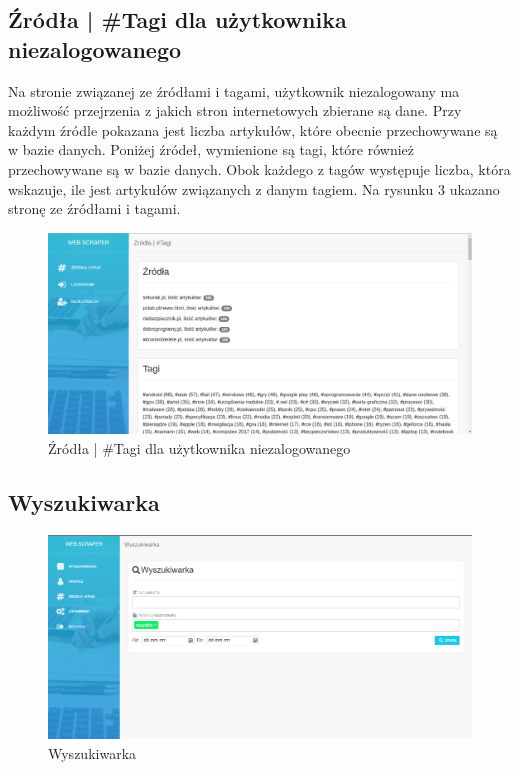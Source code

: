 \documentclass[12pt, titlepage]{article}
\begin{document}
	\subsection{Źródła | \#Tagi dla użytkownika niezalogowanego}
	Na stronie związanej ze źródłami i tagami, użytkownik niezalogowany ma możliwość przejrzenia z jakich stron internetowych zbierane są dane. Przy każdym źródle pokazana jest liczba artykułów, które obecnie przechowywane są w bazie danych. Poniżej źródeł, wymienione są tagi, które również przechowywane są w bazie danych. Obok każdego z tagów występuje liczba, która wskazuje, ile jest artykułów związanych z danym tagiem. Na rysunku 3 ukazano stronę ze źródłami i tagami.
	\begin{figure}[H]
		\centering
		\includegraphics[scale=0.45]{obrazki/niezalogowanyZrodla.png}
		\caption{Źródła | \#Tagi dla użytkownika niezalogowanego}
		\label{fig:db_schema}
	\end{figure}
	
	\newpage
	\subsection{Wyszukiwarka}
\begin{figure}[H]
	\centering
	\includegraphics[scale=0.45]{obrazki/wyszukiwarka.png}
	\caption{Wyszukiwarka}
	\label{fig:db_schema}
\end{figure}
\end{document}
